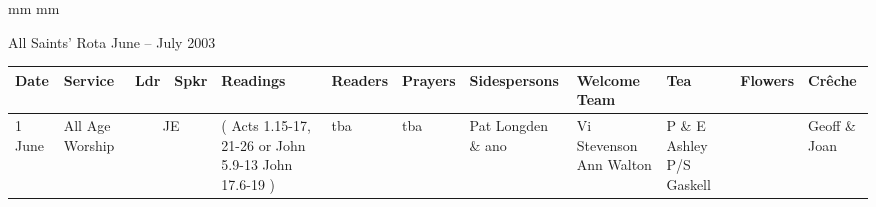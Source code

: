 \documentclass[10pt,a4paper]{article}
\newif\ifpdf
\begin{document}
\ifx\pdfoutput\undefined
\else
{} mm %
 mm
\fi
\begingroup
\ifpdf
\else
{}
\fi
\endgroup
\thispagestyle{empty}
\begin{center}
{\Large 
All Saints' Rota June -- July 2003}%
\vspace{1em}
{ \small
\begin{tabular}{|p{1.6cm}|p{1.4cm}|p{0.6cm}|p{0.6cm}|p{3.2cm}|p{2cm}|p{1.5cm}|p{2cm}|p{2.0cm}|p{2.4cm}
|p{1.6cm}|p{1.6cm}|}\hline
Date & Service
& Ldr & Spkr & Readings & Readers & Prayers &
Sidespersons & Welcome Team & Tea & Flowers & Cr\^{e}che \\ %
\hline\hline
1 June   &  All Age Worship &   \multicolumn{2}{|c|}{ JE }  &   
{\footnotesize (
Acts 1.15-17, 21-26 or
\linebreak 1 John 5.9-13
\linebreak John 17.6-19
) }
& 
tba & tba &
Pat Longden \& ano  & Vi Stevenson Ann Walton & 
P \& E Ashley P/S Gaskell
&   &  Geoff \& Joan \\ \hline %


\end{tabular}}
\end{center}
\end{document}
